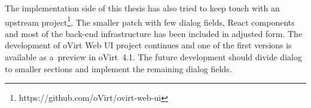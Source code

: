 The implementation side of this thesis has also tried to keep touch with an upstream project\footnote{https://github.com/oVirt/ovirt-web-ui}. The smaller patch with few dialog fields, React components and most of the back-end infrastructure has been included in adjusted form. The development of oVirt Web UI project continues and one of the first versions is available as a~preview in oVirt~4.1. The future development should divide dialog to smaller sections and implement the remaining dialog fields.


 
